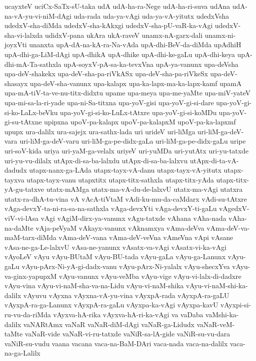 {ucayxteV
uciCx-SaTx-sU-taka
udA
udA-ha-ra-Nege
udA-ha-ri-suva
udAna
udA-na-vA-yu-vi-niM-dAgi
uda-rada
uda-ya-vAgi
uda-ya-vA-yitutx
udedxVsha
udedxV-sha-diMda
udedxV-sha-kAkxgi
udedxV-sha-pU-vaR-ka-vAgi
udedxV-sha-vi-lalxda
udidxV-pana
ukAra
ukA-raveV
unamx-nA-garx-dali
unamx-ni-joyxVti
unanxta
upA-dA-na-kA-ra-Na-vAda
upA-dhi-BeV-da-diMda
upAdhiH
upA-dhi-ga-LiM-dAgi
upA-dhikA
upA-dhike
upA-dhi-ke-gaLu
upA-dhi-keya
upA-dhi-mA-Ta-sathxla
upA-soyxV-pA-sa-ka-tevxVna
upA-ya-vanunx
upa-deVsha
upa-deV-shakekx
upa-deV-sha-pa-riVkASx
upa-deV-sha-pa-riVkeSx
upa-deV-shasayx
upa-deV-sha-vanunx
upa-kalapx
upa-ka-lapx-ma-ka-lapx-kamf
upamA
upa-mA-tiV-ta-ve-nu-titx-didxtu
upame
upa-meya
upa-me-yaMte
upa-miV-yateV
upa-mi-sa-la-ri-yade
upa-ni-Sa-titxna
upa-yoV-gisi
upa-yoV-gi-si-dare
upa-yoV-gi-si-ko-LaLx-beVku
upa-yoV-gi-si-ko-LuLx-tAtxre
upa-yoV-gi-si-koMDu
upa-yoV-gi-su-tAtxne
upipxna
upoV-pa-kalapx
upoV-pa-kalapxM
upoV-pa-ka-lapxmf
upupx
ura-dalilx
ura-sajejx
ura-sathx-lada
uri
urideV
uri-liMga
uri-liM-ga-deV-vara
uri-liM-ga-deV-varu
uri-liM-ga-pe-didx-gaLa
uri-liM-ga-pe-didx-gaLu
uripe
uri-soV-kida
uriya
uri-yaM-ga-velalx
uriyeV
uri-yuMDa
uri-yutAtx
uri-yu-tatxde
uri-yu-vu-dilalx
utApx-di-sa-ba-lalxdu
utApx-di-sa-ba-lalxvu
utApx-di-ta-vA-dadudx
utapx-nanx-ga-LAda
utapx-tayx-vA-danu
utapx-tayx-vA-yitutx
utapx-tayxva
utapx-tayx-vanu
utapxtitx
utapx-titx-sathxla
utapx-titx-yAda
utapx-titx-yA-gu-tatxve
utatx-mAMga
utatx-ma-vA-du-de-lalxvU
utatx-ma-vAgi
utatxra
utatx-ra-dhA-tu-vina
vA
vAcA-tiVtaM
vAdi-ku-mu-da-caMdarx
vAdi-su-tAtxre
vAga-devxY-ta-ni-ra-sa-na-sathxla
vAga-devxYti
vAga-devxY-ti-gaLu
vAgedxV-viV-vi-lAsa
vAgi
vAgiM-dirx-ya-vanunx
vAgu-tatxde
vAhana
vAha-nada
vAha-na-daMte
vAja-peVyaM
vAkayx-vanunx
vAknamxya
vAma-deVva
vAma-deV-va-maM-tarx-diMda
vAma-deV-vana
vAma-deV-veVna
vAmeVna
vApi
vAsane
vAsa-ne-ga-Le-lalxvU
vAsa-ne-yanunx
vAsatx-va-vAgi
vAsatx-vi-ka-vAgi
vAyoLeV
vAyu
vAyu-BUtaM
vAyu-BU-tada
vAyu-gaLa
vAyu-ga-Lanunx
vAyu-gaLu
vAyu-pArx-Ni-yA-gi-dadx-vanu
vAyu-pArx-Ni-yalalx
vAyu-shecxYva
vAyu-va-ginx-yapupxM
vAyu-vanunx
vAyu-veMba
vAyu-vige
vAyu-vi-lalx-di-dadxre
vAyu-vina
vAyu-vi-naM-sha-va-na-Lidu
vAyu-vi-naM-shika
vAyu-vi-naM-shi-ka-dalilx
vAyuvu
vAyxna
vAyxna-vA-yu-vina
vAyxpA-rada
vAyxpA-ra-gaLU
vAyxpA-ra-ga-Lanunx
vAyxpA-ra-gaLu
vAyxpa-ka-vAgi
vAyxpa-kavU
vAyxpi-si-ru-vu-da-riMda
vAyxva-hA-rika
vAyxva-hA-ri-ka-vAgi
va
vaDaba
vaMshi-ka-dalilx
vaNARtAmx
vaNaR
vaNaR-diM-dAgi
vaNaR-ga-Lidudx
vaNaR-veM-taMte
vaNaR-vide
vaNaR-vi-ru-tatxde
vaNiR-sa-lA-gide
vaNiR-su-vu-dara
vaNiR-su-vudu
vaana
vacana
vaca-na-BaM-DAri
vaca-nada
vaca-na-dalilx
vaca-na-ga-Lalilx
}
